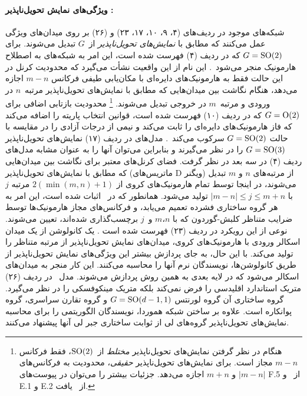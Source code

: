 \paragraph{ویژگی‌های نمایش تحویل‌ناپذیر :}
شبکه‌های موجود در ردیف‌های (۴، ۹، ۱۰، ۱۷، ۲۳) و (۲۶) بر روی میدان‌های ویژگی عمل می‌کنند که مطابق با \emph{نمایش‌های تحویل‌ناپذیر}  از~$G$ تبدیل می‌شوند.
برای $G=\operatorname{SO}(2)$ که در ردیف (۴) فهرست شده است، این امر به شبکه‌های به اصطلاح هارمونیک منجر می‌شود~\cite{Worrall2017-HNET,Weiler2019_E2CNN}.
این نام از این واقعیت نشأت می‌گیرد که محدودیت کرنل در این حالت فقط به هارمونیک‌های دایره‌ای با مکان‌یابی طیفی فرکانس $m-n$ اجازه می‌دهد، هنگام نگاشت بین میدان‌هایی که مطابق با نمایش‌های تحویل‌ناپذیر مرتبه~$n$ در ورودی و مرتبه~$m$ در خروجی تبدیل می‌شوند.%
\footnote{
	هنگام در نظر گرفتن نمایش‌های تحویل‌ناپذیر \emph{مختلط} از~$\operatorname{SO}(2)$، فقط فرکانس $m-n$ مجاز است.
	برای نمایش‌های تحویل‌ناپذیر \emph{حقیقی}، محدودیت به فرکانس‌های $|m-n|$ و $m+n$ اجازه می‌دهد.
	جزئیات بیشتر را می‌توان در پیوست‌های F.5 از~\cite{Weiler2019_E2CNN} و E.1 و E.2 از~\cite{lang2020WignerEckart} یافت.
}
محدودیت بازتابی اضافی برای $G=\operatorname{O}(2)$ که در ردیف (۱۰) فهرست شده است، قوانین انتخاب پاریته را اضافه می‌کند که فاز هارمونیک‌های دایره‌ای را ثابت می‌کند و نیمی از درجات آزادی را در مقایسه با حالت $G=\operatorname{SO}(2)$ سرکوب می‌کند~\cite{Weiler2019_E2CNN}.
مدل‌های \cite{3d_steerableCNNs,Thomas2018-TFN,miller2020relevance,Kondor2018-NBN,anderson2019cormorant} در ردیف (۱۷) نمایش‌های تحویل‌ناپذیر $G=\operatorname{SO}(3)$ را در نظر می‌گیرند و بنابراین می‌توان آنها را به عنوان مشابه مدل‌های ردیف (۴) در سه بعد در نظر گرفت.
فضای کرنل‌های معتبر برای نگاشت بین میدان‌هایی که مطابق با نمایش‌های تحویل‌ناپذیر (ماتریس‌های D ویگنر) از مرتبه‌های $n$ و $m$ تبدیل می‌شوند، در اینجا توسط تمام هارمونیک‌های کروی از $2(\min(m,n)+1)$ مرتبه $j$ با $|m-n| \leq j \leq m+n$ تولید می‌شود.
همانطور که در~\cite{lang2020WignerEckart} اثبات شده است، این امر به هر گروه ساختاری فشرده تعمیم می‌یابد، و فرکانس‌های مجاز هارمونیک‌ها توسط ضرایب متناظر کلبش-گوردون که با $m، n$ و~$j$ برچسب‌گذاری شده‌اند، تعیین می‌شوند.
نوعی از این رویکرد در ردیف (۲۳) فهرست شده است \cite{poulenard2019effective}.
یک کانولوشن از یک میدان اسکالر ورودی با هارمونیک‌های کروی، میدان‌های نمایش تحویل‌ناپذیر از مرتبه متناظر را تولید می‌کند.
با این حال، به جای پردازش بیشتر این ویژگی‌های نمایش تحویل‌ناپذیر از طریق کانولوشن‌ها، نویسندگان نرم آنها را محاسبه می‌کنند.
این کار منجر به میدان‌های اسکالر می‌شود که در لایه بعدی به همین روش پردازش می‌شوند.
مدل~\cite{shutty2020learning} در ردیف (۲۶) متریک استاندارد اقلیدسی را فرض نمی‌کند بلکه متریک مینکوفسکی را در نظر می‌گیرد.
گروه ساختاری آن گروه لورنتس $G=\operatorname{SO}(d-1,1)$ و گروه تقارن سراسری، گروه پوانکاره است.
علاوه بر ساختن شبکه هموردا، نویسندگان الگوریتمی را برای محاسبه نمایش‌های تحویل‌ناپذیر گروه‌های لی از ثوابت ساختاری جبر لی آنها پیشنهاد می‌کنند.



